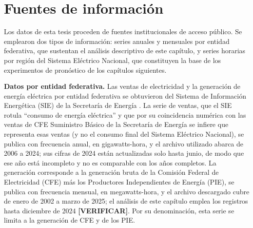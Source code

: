 
\section{Fuentes de información}\label{sec:fuentes}

Los datos de esta tesis proceden de fuentes institucionales de acceso público. Se emplearon dos tipos de información: series anuales y mensuales por entidad federativa, que sustentan el análisis descriptivo de este capítulo, y series horarias por región del Sistema Eléctrico Nacional, que constituyen la base de los experimentos de pronóstico de los capítulos siguientes.

\textbf{Datos por entidad federativa.} Las ventas de electricidad y la generación de energía eléctrica por entidad federativa se obtuvieron del Sistema de Información Energética (SIE) de la Secretaría de Energía \cite{SIE}. La serie de ventas, que el SIE rotula ``consumo de energía eléctrica'' y que por su coincidencia numérica con las ventas de CFE Suministro Básico de la Secretaría de Energía \cite{SENER_InformePormenorizado2023} se infiere que representa esas ventas (y no el consumo final del Sistema Eléctrico Nacional), se publica con frecuencia anual, en gigawatts-hora, y el archivo utilizado abarca de 2006 a 2024; sus cifras de 2024 están actualizadas solo hasta junio, de modo que ese año está incompleto y no es comparable con los años completos. La generación corresponde a la generación bruta de la Comisión Federal de Electricidad (CFE) más los Productores Independientes de Energía (PIE), se publica con frecuencia mensual, en megawatts-hora, y el archivo descargado cubre de enero de 2002 a marzo de 2025; el análisis de este capítulo emplea los registros hasta diciembre de 2024 \textbf{[VERIFICAR]}. Por su denominación, esta serie se limita a la generación de CFE y de los PIE.

